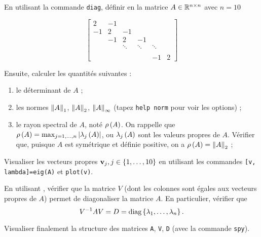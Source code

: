En utilisant la commande \texttt{diag}, définir en \MAT la matrice $A \in \mathbb{R}^{n \times n}$ avec $n = 10$

\begin{equation*}
  \begin{bmatrix}
      2   & -1  &         &         &         &    \\
      -1  & 2   & -1      &         &         &    \\
          & -1  & 2       & -1      &         &    \\
          &     & \ddots  & \ddots  & \ddots  &     \\
          &     &         &         &         &    \\
          &     &         &         &    -1   &  2  
    \end{bmatrix}
\end{equation*}


Ensuite, calculer les quantités suivantes :
\begin{enumerate}[label=\alph*)]
  \item le déterminant de $A$ ;
  \item les normes $\left\lVert A\right\rVert_{1}$, $\left\lVert A\right\rVert_{2}$, $\left\lVert A\right\rVert_{\infty}$ (tapez \texttt{help norm} pour voir les options) ;
  \item le rayon spectral de $A$, noté $\rho \left(A\right)$. On rappelle que $\rho \left(A\right) = \max_{j = 1, \dots, n} \left\lvert\lambda_{j} \left(A\right)\right\rvert$, ou $\lambda_{j} \left(A\right)$ sont les valeurs propres de $A$. Vérifier que, puisque $A$ est symétrique et définie positive, on a $\rho \left(A\right) = \left\lVert A\right\rVert_{2}$ ;
\end{enumerate}

Visualiser les vecteurs propres $\mathbf{v}_{j}, j \in \left\{1, \dots, 10\right\}$ en utilisant les commandes \texttt{[v, lambda]=eig(A)} et \texttt{plot(v)}.


En utilisant \MAT, vérifier que la matrice $V$ (dont les colonnes sont égales aux vecteurs propres de $A$) permet de diagonaliser la matrice $A$. En particulier, vérifier que
\begin{equation*}
  V^{-1} A V = D = \text{diag} \left\{\lambda_{1}, \dots, \lambda_{n}\right\}.
\end{equation*}


Visualiser finalement la structure des matrices \texttt{A}, \texttt{V}, \texttt{D} (avec la commande \texttt{spy}).

